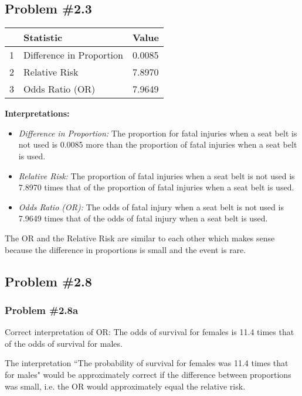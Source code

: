 \documentclass[12pt, letterpaper]{article}
\begin{document}
\subsection*{Problem {\#}2.3}  
\begin{table}[ht]
	\centering
	\begin{tabular}{rll}
		\hline
		& Statistic & Value \\ 
		\hline
		1 & Difference in Proportion & 0.0085 \\ 
		2 & Relative Risk & 7.8970 \\ 
		3 & Odds Ratio (OR) & 7.9649 \\ 
		\hline
	\end{tabular}
\end{table}
\textbf{Interpretations:} 
\begin{itemize}
	\item \textit{Difference in Proportion:} The proportion for fatal injuries when a seat belt is not used is 0.0085 more than the proportion of fatal injuries when a seat belt is used.   
	\item \textit{Relative Risk:} The proportion of fatal injuries when a seat belt is not used is 7.8970 times that of the proportion of fatal injuries when a seat belt is used.    
	\item \textit{Odds Ratio (OR):} The odds of fatal injury when a seat belt is not used is 7.9649 times that of the odds of fatal injury when a seat belt is used.  
\end{itemize}
The OR and the Relative Risk are similar to each other which makes sense because the difference in proportions is small and the event is rare.  
 


\subsection*{Problem {\#}2.8}

\subsubsection*{Problem {\#}2.8a} 
Correct interpretation of OR: The odds of survival for females is 11.4 times that of the odds of survival for males.  

The interpretation ``The probability of survival for females was 11.4 times that for males" would be approximately correct if the difference between proportions was small, i.e. the OR would approximately equal the relative risk.
  
\end{document}
